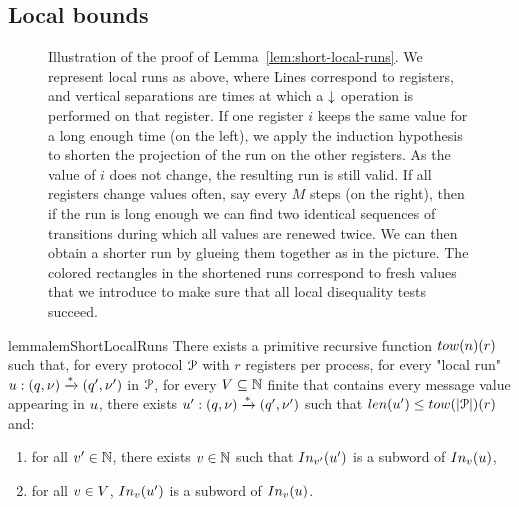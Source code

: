 \subsection{Local bounds}
\label{sec:local-bounds}


\begin{figure}
	
	\caption{Illustration of the proof of Lemma~\ref{lem:short-local-runs}. We represent local runs as above, where Lines correspond to registers, and vertical separations are times at which a $\downarrow$ operation is performed on that register. If one register $i$ keeps the same value for a long enough time (on the left), we apply the induction hypothesis to shorten the projection of the run on the other registers. As the value of $i$ does not change, the resulting run is still valid. If all registers change values often, say every $M$ steps (on the right), then if the run is long enough we can find two identical sequences of transitions during which all values are renewed twice. We can then obtain a shorter run by glueing them together as in the picture. The colored rectangles in the shortened runs correspond to fresh values that we introduce to make sure that all local disequality tests succeed.}
\end{figure}
\begin{restatable}{lemma}{lemShortLocalRuns}
	\label{lem:short-local-runs}
	There exists a primitive recursive function $\towerfun(n) (\regnum)$ such that, for every protocol $\mathcal{P}$ with $r$ registers per process, for every "local run" $u: (q, \nu) \xrightarrow{*} (q', \nu')$ in $\mathcal{P}$, for every $V \subseteq \mathbb{N}$ finite that contains every message value appearing in $u$, there exists $u': (q, \nu) \xrightarrow{*} (q', \nu')$ such that $\length{\localrun'} \leq \towerfun(\size{\prot})(r)$ and:
	\begin{enumerate}
		\item \label{item:shorterrun_anyvalue} for all $v' \in \mathbb{N}$, there exists $v \in \mathbb{N}$ such that $\vinput{\aval'}{\localrun'}$ is a subword of $\vinput{\aval}{\localrun}$,
		\item \label{item:shorterrun_oldvalues} for all $v \in V$, $\vinput{\aval}{\localrun'}$ is a subword of $\vinput{\aval}{\localrun}$. 
	\end{enumerate}
\end{restatable}

